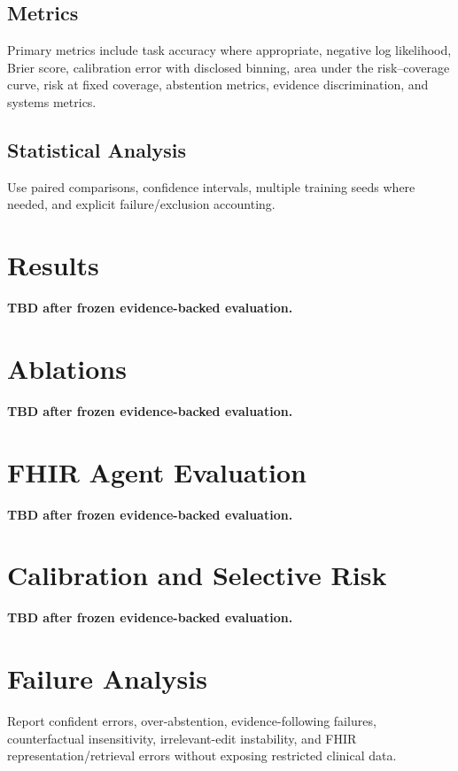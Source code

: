 \documentclass[11pt]{article}
\begin{document}
\subsection{Metrics}
Primary metrics include task accuracy where appropriate, negative log
likelihood, Brier score, calibration error with disclosed binning, area under the
risk--coverage curve, risk at fixed coverage, abstention metrics, evidence
discrimination, and systems metrics.

\subsection{Statistical Analysis}
Use paired comparisons, confidence intervals, multiple training seeds where
needed, and explicit failure/exclusion accounting.

\section{Results}

\textbf{TBD after frozen evidence-backed evaluation.}

\section{Ablations}

\textbf{TBD after frozen evidence-backed evaluation.}

\section{FHIR Agent Evaluation}

\textbf{TBD after frozen evidence-backed evaluation.}

\section{Calibration and Selective Risk}

\textbf{TBD after frozen evidence-backed evaluation.}

\section{Failure Analysis}

Report confident errors, over-abstention, evidence-following failures,
counterfactual insensitivity, irrelevant-edit instability, and FHIR
representation/retrieval errors without exposing restricted clinical data.
\end{document}
